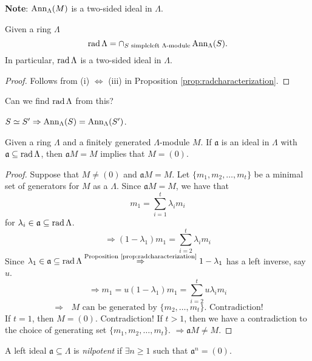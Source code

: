 \textbf{Note}: $\operatorname{Ann}\nolimits_\Lambda(M)$ is a two-sided ideal in $\Lambda$. 

\begin{cor}
Given a ring $\Lambda$
\[\operatorname{rad}\nolimits\Lambda = \cap_{S \text{\ simple}\\ \text{left
      $\Lambda$-module}} \operatorname{Ann}\nolimits_\Lambda(S).\]
In particular, $\operatorname{rad}\nolimits\Lambda$ is a two-sided ideal in $\Lambda$. 
\end{cor}
\begin{proof}
Follows from (i) $\Leftrightarrow$ (iii) in Proposition
\ref{prop:radcharacterization}. 
\end{proof}

Can we find $\operatorname{rad}\nolimits\Lambda$ from this?

$S\simeq S' \Rightarrow \operatorname{Ann}\nolimits_\Lambda(S) = \operatorname{Ann}\nolimits_\Lambda(S')$. 

\begin{thm}
Given a ring $\Lambda$ and a finitely generated $\Lambda$-module $M$.
If $\mathfrak{a}$ is an ideal in $\Lambda$ with $\mathfrak{a}\subseteq
\operatorname{rad}\nolimits\Lambda$, then $\mathfrak{a} M = M$ implies that $M = (0)$. 
\end{thm}
\begin{proof}
Suppose that $M\neq (0)$ and $\mathfrak{a}M = M$.  Let
$\{m_1,m_2,\ldots,m_t\}$ be a minimal set of generators for $M$ as a
$\Lambda$.  Since $\mathfrak{a}M=M$, we have that 
\[m_1 = \sum_{i=1}^t \lambda_im_i\]
for $\lambda_i\in\mathfrak{a}\subseteq \operatorname{rad}\nolimits\Lambda$. 
\[\Rightarrow (1 - \lambda_1)m_1 = \sum_{i=2}^t \lambda_im_i\]
Since $\lambda_1\in\mathfrak{a}\subseteq \operatorname{rad}\nolimits\Lambda
\stackrel{\textrm{Proposition \ref{prop:radcharacterization}}}{\Rightarrow} 1 -
\lambda_1$ has a left inverse, say $u$.
\[\Rightarrow m_1 = u(1 - \lambda_1) m_1 = \sum_{i=2}^t
  u\lambda_im_i\]
\[\Rightarrow \text{\ $M$ can be generated by $\{m_2,\ldots,m_t\}$.  Contradiction!}\]
If $t=1$, then $M = (0)$.  Contradiction!  If $t > 1$, then we have a
contradiction to the choice of generating set
$\{m_1,m_2,\ldots,m_t\}$. $\Rightarrow \mathfrak{a} M \neq M$. 
\end{proof}

\begin{recall}
A left ideal $\mathfrak{a}\subseteq \Lambda$ is
\emph{nilpotent} if
$\exists n \geq 1$ such that $\mathfrak{a}^n = (0)$. 
\end{recall}

